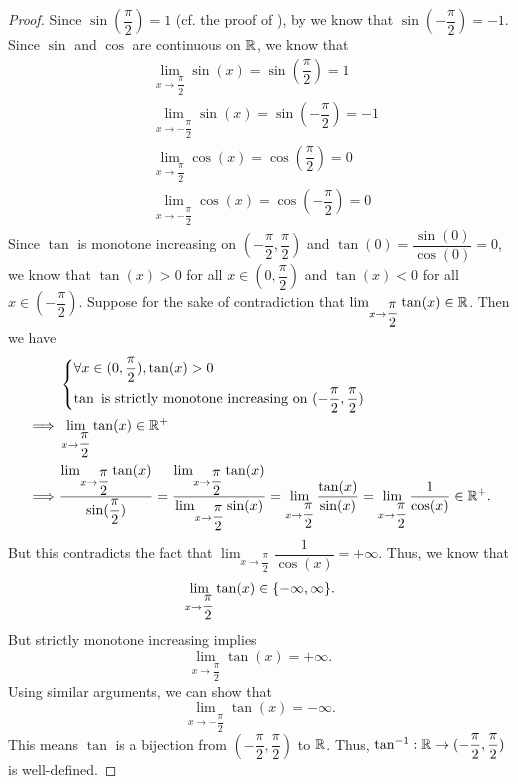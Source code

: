 \begin{proof}
  Since \(\sin(\dfrac{\pi}{2}) = 1\) (cf. the proof of ), by  we know that \(\sin(-\dfrac{\pi}{2}) = -1\).
  Since \(\sin\) and \(\cos\) are continuous on \(\mathbb{R}\), we know that
  \begin{align*}
     & \lim_{x \to \dfrac{\pi}{2}} \sin(x) = \sin(\dfrac{\pi}{2}) = 1    \\
     & \lim_{x \to -\dfrac{\pi}{2}} \sin(x) = \sin(-\dfrac{\pi}{2}) = -1 \\
     & \lim_{x \to \dfrac{\pi}{2}} \cos(x) = \cos(\dfrac{\pi}{2}) = 0    \\
     & \lim_{x \to -\dfrac{\pi}{2}} \cos(x) = \cos(-\dfrac{\pi}{2}) = 0
  \end{align*}
  Since \(\tan\) is monotone increasing on \((-\dfrac{\pi}{2}, \dfrac{\pi}{2})\) and \(\tan(0) = \dfrac{\sin(0)}{\cos(0)} = 0\), we know that \(\tan(x) > 0\) for all \(x \in (0, \dfrac{\pi}{2})\) and \(\tan(x) < 0\) for all \(x \in (-\dfrac{\pi}{2})\).
  Suppose for the sake of contradiction that \(\lim_{x \to \dfrac{\pi}{2}} \tan(x) \in \mathbb{R}\).
  Then we have
  \begin{align*}
             & \begin{dcases}
                 \forall x \in (0, \dfrac{\pi}{2}), \tan(x) > 0 \\
                 \tan \text{ is strictly monotone increasing on } (-\dfrac{\pi}{2}, \dfrac{\pi}{2})
               \end{dcases}                                                                                                                                                                                      \\
    \implies & \lim_{x \to \dfrac{\pi}{2}} \tan(x) \in \mathbb{R}^+                                                                                                                                                                                                                           \\
    \implies & \dfrac{\lim_{x \to \dfrac{\pi}{2}} \tan(x)}{\sin(\dfrac{\pi}{2})} = \dfrac{\lim_{x \to \dfrac{\pi}{2}} \tan(x)}{\lim_{x \to \dfrac{\pi}{2}} \sin(x)} = \lim_{x \to \dfrac{\pi}{2}} \dfrac{\tan(x)}{\sin(x)} = \lim_{x \to \dfrac{\pi}{2}} \dfrac{1}{\cos(x)} \in \mathbb{R}^+.
  \end{align*}
  But this contradicts the fact that \(\lim_{x \to \dfrac{\pi}{2}} \dfrac{1}{\cos(x)} = +\infty\).
  Thus, we know that
  \[
    \lim_{x \to \dfrac{\pi}{2}} \tan(x) \in \set{-\infty, \infty}.
  \]
  But strictly monotone increasing implies
  \[
    \lim_{x \to \dfrac{\pi}{2}} \tan(x) = +\infty.
  \]
  Using similar arguments, we can show that
  \[
    \lim_{x \to -\dfrac{\pi}{2}} \tan(x) = -\infty.
  \]
  This means \(\tan\) is a bijection from \((-\dfrac{\pi}{2}, \dfrac{\pi}{2})\) to \(\mathbb{R}\).
  Thus, \(\tan^{-1} : \mathbb{R} \to (-\dfrac{\pi}{2}, \dfrac{\pi}{2})\) is well-defined.


\end{proof}
